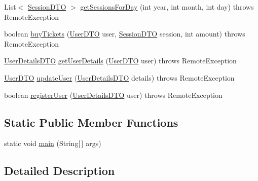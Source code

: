 \begin{DoxyCompactItemize}
\item 
List$<$ \mbox{\hyperlink{classes_1_1deusto_1_1server_1_1data_1_1_session_d_t_o}{Session\+D\+TO}} $>$ \mbox{\hyperlink{classes_1_1deusto_1_1server_1_1_server_a688ca336b3cbdb5c04ecdc4f23ff65d1}{get\+Sessions\+For\+Day}} (int year, int month, int day)  throws Remote\+Exception 
\item 
boolean \mbox{\hyperlink{classes_1_1deusto_1_1server_1_1_server_a3bbf9f19774d2fae5c831cfac1f2306c}{buy\+Tickets}} (\mbox{\hyperlink{classes_1_1deusto_1_1server_1_1data_1_1_user_d_t_o}{User\+D\+TO}} user, \mbox{\hyperlink{classes_1_1deusto_1_1server_1_1data_1_1_session_d_t_o}{Session\+D\+TO}} session, int amount)  throws Remote\+Exception 
\item 
\mbox{\hyperlink{classes_1_1deusto_1_1server_1_1data_1_1_user_details_d_t_o}{User\+Details\+D\+TO}} \mbox{\hyperlink{classes_1_1deusto_1_1server_1_1_server_ad742fe9a45edccd8b2309be98a74baae}{get\+User\+Details}} (\mbox{\hyperlink{classes_1_1deusto_1_1server_1_1data_1_1_user_d_t_o}{User\+D\+TO}} user)  throws Remote\+Exception 
\item 
\mbox{\hyperlink{classes_1_1deusto_1_1server_1_1data_1_1_user_d_t_o}{User\+D\+TO}} \mbox{\hyperlink{classes_1_1deusto_1_1server_1_1_server_a74082f91af2065cd600c147296090921}{update\+User}} (\mbox{\hyperlink{classes_1_1deusto_1_1server_1_1data_1_1_user_details_d_t_o}{User\+Details\+D\+TO}} details)  throws Remote\+Exception 
\item 
boolean \mbox{\hyperlink{classes_1_1deusto_1_1server_1_1_server_a6a419bd82bce60f072b4c7f5a527abdc}{register\+User}} (\mbox{\hyperlink{classes_1_1deusto_1_1server_1_1data_1_1_user_details_d_t_o}{User\+Details\+D\+TO}} user)  throws Remote\+Exception 
\end{DoxyCompactItemize}
\subsection*{Static Public Member Functions}
\begin{DoxyCompactItemize}
\item 
static void \mbox{\hyperlink{classes_1_1deusto_1_1server_1_1_server_a750bb0d7dbd89246a3602f2e20d03fb5}{main}} (String\mbox{[}$\,$\mbox{]} args)
\end{DoxyCompactItemize}


\subsection{Detailed Description}


